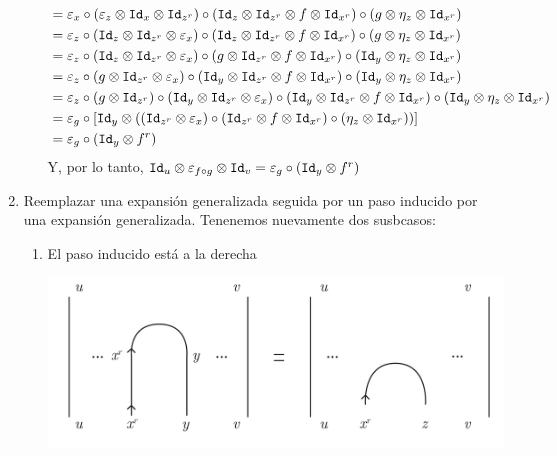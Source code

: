 \documentclass[../main.tex]{subfiles}
\begin{document}
\begin{enumerate}
\begin{enumerate}
\begin{align*}
                &=\varepsilon_x \circ (\varepsilon_z \otimes \texttt{Id}_x \otimes \texttt{Id}_{z^r}) \circ (\texttt{Id}_z \otimes \texttt{Id}_{z^r} \otimes f \otimes \texttt{Id}_{x^r}) \circ (g \otimes \eta_z \otimes \texttt{Id}_{x^r}) \\
                &=\varepsilon_z \circ (\texttt{Id}_z \otimes \texttt{Id}_{z^r} \otimes \varepsilon_x) \circ (\texttt{Id}_z \otimes \texttt{Id}_{z^r} \otimes f \otimes \texttt{Id}_{x^r}) \circ (g \otimes \eta_z \otimes \texttt{Id}_{x^r}) \\
                &=\varepsilon_z \circ (\texttt{Id}_z \otimes \texttt{Id}_{z^r} \otimes \varepsilon_x) \circ (g \otimes \texttt{Id}_{z^r} \otimes f \otimes \texttt{Id}_{x^r}) \circ (\texttt{Id}_y \otimes \eta_z \otimes \texttt{Id}_{x^r}) \\
                &=\varepsilon_z \circ (g \otimes \texttt{Id}_{z^r} \otimes \varepsilon_x) \circ (\texttt{Id}_y \otimes \texttt{Id}_{z^r} \otimes f \otimes \texttt{Id}_{x^r}) \circ (\texttt{Id}_y \otimes \eta_z \otimes \texttt{Id}_{x^r}) \\
                &=\varepsilon_z \circ (g \otimes \texttt{Id}_{z^r}) \circ (\texttt{Id}_y \otimes \texttt{Id}_{z^r} \otimes \varepsilon_x) \circ (\texttt{Id}_y \otimes \texttt{Id}_{z^r} \otimes f \otimes \texttt{Id}_{x^r}) \circ (\texttt{Id}_y \otimes \eta_z \otimes \texttt{Id}_{x^r}) \\
                &= \varepsilon_g \circ [\texttt{Id}_y \otimes ((\texttt{Id}_{z^r} \otimes \varepsilon_x) \circ (\texttt{Id}_{z^r} \otimes f \otimes \texttt{Id}_{x^r}) \circ (\eta_z \otimes \texttt{Id}_{x^r}))] \\
                &= \varepsilon_g \circ (\texttt{Id}_y \otimes f^r)
            \end{align*}
        Y, por lo tanto, $\texttt{Id}_u \otimes \varepsilon_{f \circ g} \otimes \texttt{Id}_v = \varepsilon_g \circ (\texttt{Id}_y \otimes f^r)$
        \end{enumerate}
        \item Reemplazar una expansión generalizada seguida por un paso inducido por una expansión generalizada. Tenenemos nuevamente dos susbcasos:
        \begin{enumerate}
            \item El paso inducido está a la derecha
            \begin{center} \includegraphics[scale=.2]{TeX/diagrama/5-12.pdf}

\end{center}
\end{enumerate}
\end{enumerate}
\end{document}
